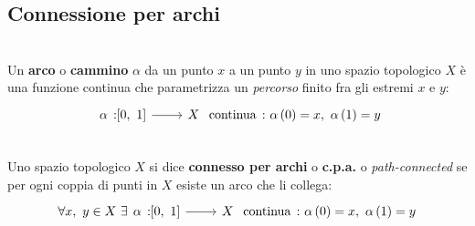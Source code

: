 \subsection{Connessione per archi}
\begin{define}[Arco.]~{}\\
Un \textbf{arco} o \textbf{cammino} $\alpha$ da un punto $x$ a un punto $y$ in uno spazio topologico $X$ è una funzione continua che parametrizza un \textit{percorso} finito fra gli estremi $x$ e $y$:
\begin{equation}
\funz{\alpha}{\left[0,\ 1\right]}{X} \text{ continua}\ \colon \alpha\left(0\right)=x,\ \alpha\left(1\right)=y
\end{equation}
\vspace{-6mm}
\end{define}
\begin{define}~{}\\
Uno spazio topologico $X$ si dice \textbf{connesso per archi} o \textbf{c.p.a.} o \textit{path-connected} se per ogni coppia di punti in $X$ esiste un arco che li collega:
\begin{equation}
\forall x,\ y\in X\ \exists \funz{\alpha}{\left[0,\ 1\right]}{X} \text{ continua}\ \colon \alpha\left(0\right)=x,\ \alpha\left(1\right)=y
\end{equation}
\vspace{-6mm}
\end{define}
\begin{theorema}~{}\\
\end{theorema}
